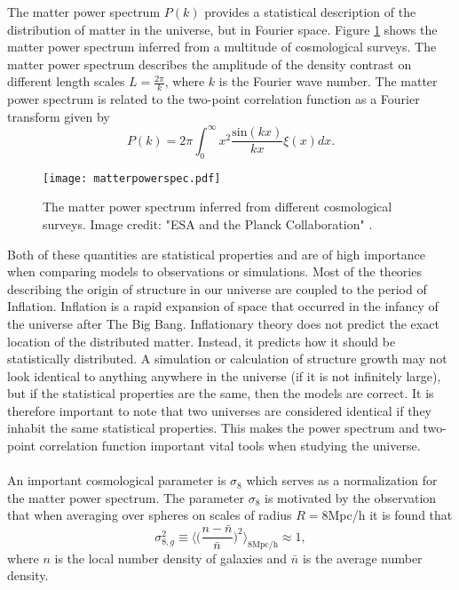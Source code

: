 The matter power spectrum $P(k)$ provides a statistical description of the
distribution of matter in the universe, but in Fourier space. Figure
\ref{fig:matterpowerspec} shows the matter power spectrum inferred from a multitude
of cosmological surveys. The matter power spectrum describes the amplitude of 
the density contrast on different length scales $L=\frac{2\pi}{k}$, where $k$ is
the Fourier wave number. The matter power spectrum is related to the two-point
correlation function as a Fourier transform given by
\begin{equation}
    P(k)=2\pi\int_0^\infty x^2\frac{\mathrm{sin}(kx)}{kx}\xi(x)dx.
\end{equation}
\begin{figure}[htbp]
    \texttt{[image: matterpowerspec.pdf]}
    \caption{The matter power spectrum inferred from different cosmological surveys. Image credit: "ESA and the Planck Collaboration" \cite{2020}.}
    \label{fig:matterpowerspec}
\end{figure}
Both of these quantities are statistical properties and are of high importance
when comparing models to observations or simulations. Most of the theories describing 
the origin of structure in our universe are coupled to the period of Inflation. Inflation is a rapid expansion
of space that occurred in the infancy of the universe after The Big Bang.
Inflationary theory does not predict the exact location of the distributed matter.
Instead, it predicts how it should be statistically distributed.
A simulation or calculation of structure growth may
not look identical to anything anywhere in the universe (if it is not infinitely
large), but if the statistical properties are the same, then the models are
correct. It is therefore important to
note that two universes are considered identical if they inhabit the same
statistical properties. This makes the power spectrum and two-point correlation function
important vital tools when studying the universe.
\\\\\indent
An important cosmological parameter is $\sigma_8$ which serves as a normalization for the matter power spectrum. The parameter $\sigma_8$ is motivated by the observation that when averaging over spheres on scales of radius $R=8$Mpc/h it is found that
\begin{equation}
    \sigma_{8,g}^2\equiv\Big\langle\Big(\frac{n-\bar{n}}{\bar{n}}\Big)^2\Big\rangle_{8\mathrm{Mpc/h}}\approx1,
\end{equation}
where $n$ is the local number density of galaxies and $\bar{n}$ is the average number density.
